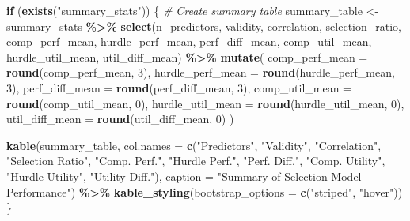 \documentclass[
]{article}
\newenvironment{Shaded}{\begin{snugshade}}{\end{snugshade}}
\newcommand{\AttributeTok}[1]{\textcolor[rgb]{0.13,0.29,0.53}{#1}}
\newcommand{\CommentTok}[1]{\textcolor[rgb]{0.56,0.35,0.01}{\textit{#1}}}
\newcommand{\ControlFlowTok}[1]{\textcolor[rgb]{0.13,0.29,0.53}{\textbf{#1}}}
\newcommand{\DecValTok}[1]{\textcolor[rgb]{0.00,0.00,0.81}{#1}}
\newcommand{\FunctionTok}[1]{\textcolor[rgb]{0.13,0.29,0.53}{\textbf{#1}}}
\newcommand{\NormalTok}[1]{#1}
\newcommand{\OtherTok}[1]{\textcolor[rgb]{0.56,0.35,0.01}{#1}}
\newcommand{\SpecialCharTok}[1]{\textcolor[rgb]{0.81,0.36,0.00}{\textbf{#1}}}
\newcommand{\StringTok}[1]{\textcolor[rgb]{0.31,0.60,0.02}{#1}}
\begin{document}
\begin{Shaded}
\begin{Highlighting}[]
\ControlFlowTok{if}\NormalTok{ (}\FunctionTok{exists}\NormalTok{(}\StringTok{"summary\_stats"}\NormalTok{)) \{}
  \CommentTok{\# Create summary table}
\NormalTok{  summary\_table }\OtherTok{\textless{}{-}}\NormalTok{ summary\_stats }\SpecialCharTok{\%\textgreater{}\%}
    \FunctionTok{select}\NormalTok{(n\_predictors, validity, correlation, selection\_ratio,}
\NormalTok{           comp\_perf\_mean, hurdle\_perf\_mean, perf\_diff\_mean,}
\NormalTok{           comp\_util\_mean, hurdle\_util\_mean, util\_diff\_mean) }\SpecialCharTok{\%\textgreater{}\%}
    \FunctionTok{mutate}\NormalTok{(}
      \AttributeTok{comp\_perf\_mean =} \FunctionTok{round}\NormalTok{(comp\_perf\_mean, }\DecValTok{3}\NormalTok{),}
      \AttributeTok{hurdle\_perf\_mean =} \FunctionTok{round}\NormalTok{(hurdle\_perf\_mean, }\DecValTok{3}\NormalTok{),}
      \AttributeTok{perf\_diff\_mean =} \FunctionTok{round}\NormalTok{(perf\_diff\_mean, }\DecValTok{3}\NormalTok{),}
      \AttributeTok{comp\_util\_mean =} \FunctionTok{round}\NormalTok{(comp\_util\_mean, }\DecValTok{0}\NormalTok{),}
      \AttributeTok{hurdle\_util\_mean =} \FunctionTok{round}\NormalTok{(hurdle\_util\_mean, }\DecValTok{0}\NormalTok{),}
      \AttributeTok{util\_diff\_mean =} \FunctionTok{round}\NormalTok{(util\_diff\_mean, }\DecValTok{0}\NormalTok{)}
\NormalTok{    )}
  
  \FunctionTok{kable}\NormalTok{(summary\_table, }
        \AttributeTok{col.names =} \FunctionTok{c}\NormalTok{(}\StringTok{"Predictors"}\NormalTok{, }\StringTok{"Validity"}\NormalTok{, }\StringTok{"Correlation"}\NormalTok{, }\StringTok{"Selection Ratio"}\NormalTok{,}
                     \StringTok{"Comp. Perf."}\NormalTok{, }\StringTok{"Hurdle Perf."}\NormalTok{, }\StringTok{"Perf. Diff."}\NormalTok{,}
                     \StringTok{"Comp. Utility"}\NormalTok{, }\StringTok{"Hurdle Utility"}\NormalTok{, }\StringTok{"Utility Diff."}\NormalTok{),}
        \AttributeTok{caption =} \StringTok{"Summary of Selection Model Performance"}\NormalTok{) }\SpecialCharTok{\%\textgreater{}\%}
    \FunctionTok{kable\_styling}\NormalTok{(}\AttributeTok{bootstrap\_options =} \FunctionTok{c}\NormalTok{(}\StringTok{"striped"}\NormalTok{, }\StringTok{"hover"}\NormalTok{))}
\NormalTok{\}}
\end{Highlighting}
\end{Shaded}
\end{document}
